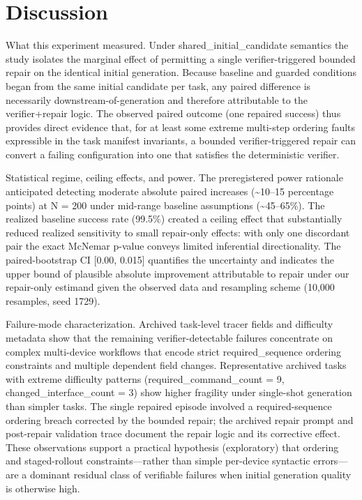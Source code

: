 \documentclass[conference]{IEEEtran}
\begin{document}
\section{Discussion}
What this experiment measured. Under shared\_initial\_candidate semantics the study isolates the marginal effect of permitting a single verifier-triggered bounded repair on the identical initial generation. Because baseline and guarded conditions began from the same initial candidate per task, any paired difference is necessarily downstream-of-generation and therefore attributable to the verifier+repair logic. The observed paired outcome (one repaired success) thus provides direct evidence that, for at least some extreme multi-step ordering faults expressible in the task manifest invariants, a bounded verifier-triggered repair can convert a failing configuration into one that satisfies the deterministic verifier.

Statistical regime, ceiling effects, and power. The preregistered power rationale anticipated detecting moderate absolute paired increases (\textasciitilde{}10--15 percentage points) at N = 200 under mid-range baseline assumptions (\textasciitilde{}45--65\%). The realized baseline success rate (99.5\%) created a ceiling effect that substantially reduced realized sensitivity to small repair-only effects: with only one discordant pair the exact McNemar p-value conveys limited inferential directionality. The paired-bootstrap CI [0.00, 0.015] quantifies the uncertainty and indicates the upper bound of plausible absolute improvement attributable to repair under our repair-only estimand given the observed data and resampling scheme (10,000 resamples, seed 1729).

Failure-mode characterization. Archived task-level tracer fields and difficulty metadata show that the remaining verifier-detectable failures concentrate on complex multi-device workflows that encode strict required\_sequence ordering constraints and multiple dependent field changes. Representative archived tasks with extreme difficulty patterns (required\_command\_count = 9, changed\_interface\_count = 3) show higher fragility under single-shot generation than simpler tasks. The single repaired episode involved a required-sequence ordering breach corrected by the bounded repair; the archived repair prompt and post-repair validation trace document the repair logic and its corrective effect. These observations support a practical hypothesis (exploratory) that ordering and staged-rollout constraints---rather than simple per-device syntactic errors---are a dominant residual class of verifiable failures when initial generation quality is otherwise high.
\end{document}
